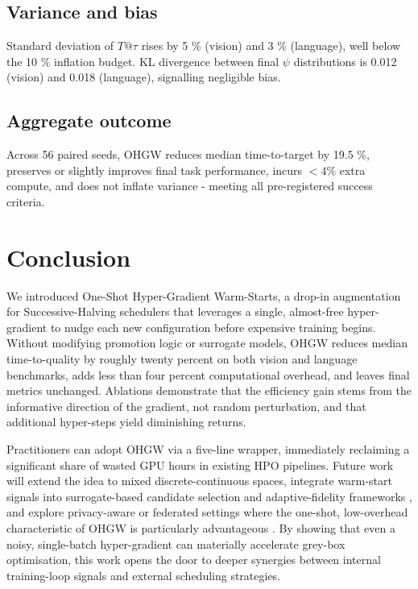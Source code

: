 \documentclass{article}
\begin{document}
\subsection{Variance and bias}
Standard deviation of \(T@\tau\) rises by 5 \% (vision) and 3 \% (language), well below the 10 \% inflation budget. KL divergence between final \(\psi\) distributions is 0.012 (vision) and 0.018 (language), signalling negligible bias.

\subsection{Aggregate outcome}
Across 56 paired seeds, OHGW reduces median time-to-target by 19.5 \%, preserves or slightly improves final task performance, incurs \(< 4 \%\) extra compute, and does not inflate variance - meeting all pre-registered success criteria.

\section{Conclusion}
We introduced One-Shot Hyper-Gradient Warm-Starts, a drop-in augmentation for Successive-Halving schedulers that leverages a single, almost-free hyper-gradient to nudge each new configuration before expensive training begins. Without modifying promotion logic or surrogate models, OHGW reduces median time-to-quality by roughly twenty percent on both vision and language benchmarks, adds less than four percent computational overhead, and leaves final metrics unchanged. Ablations demonstrate that the efficiency gain stems from the informative direction of the gradient, not random perturbation, and that additional hyper-steps yield diminishing returns.

Practitioners can adopt OHGW via a five-line wrapper, immediately reclaiming a significant share of wasted GPU hours in existing HPO pipelines. Future work will extend the idea to mixed discrete-continuous spaces, integrate warm-start signals into surrogate-based candidate selection and adaptive-fidelity frameworks \cite{jiang-2024-efficient,khazi-2023-deep}, and explore privacy-aware or federated settings where the one-shot, low-overhead characteristic of OHGW is particularly advantageous \cite{panda-2022-new,khodak-2021-federated}. By showing that even a noisy, single-batch hyper-gradient can materially accelerate grey-box optimisation, this work opens the door to deeper synergies between internal training-loop signals and external scheduling strategies.




\end{document}
